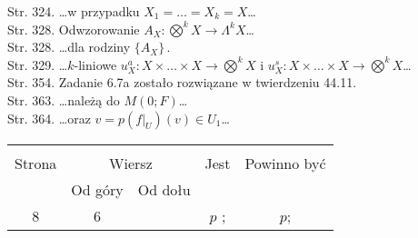 \documentclass[a4paper,11pt]{article}
\begin{document}
Str. 324. \ldots w przypadku $X_{ 1 } = \ldots = X_{ k } = X$\ldots \\
Str. 328. Odwzorowanie $A_{ X } : \bigotimes^{ k } X \rightarrow \Lambda^{ k } X$\ldots \\
Str. 328. \ldots dla rodziny $\{ A_{ X } \} \, .$ \\
Str. 329. \ldots $k$-liniowe
$u^{ a }_{ X } : X \times \ldots \times X \rightarrow \bigotimes^{ k } X$ i
$u^{ s }_{ X } : X \times \ldots \times X \rightarrow \bigotimes^{ k } X$\ldots \\
Str. 354. Zadanie \romannumeral6.7a zostało rozwiązane w
twierdzeniu 44.11. \\
Str. 363. \ldots należą do $M( 0; F )$\ldots \\
Str. 364. \ldots oraz $v = p( f |_{ U } ) ( v ) \in U_{ 1 }$\ldots \\




















\begin{center}

  \begin{tabular}{|c|c|c|c|c|}
    \hline
    & \multicolumn{2}{c|}{} & & \\
    Strona & \multicolumn{2}{c|}{Wiersz} & Jest
                              & Powinno być \\ \cline{2-3}
    & Od góry & Od dołu & & \\
    \hline
    8   & 6 & & $p$ ; & $p$; \\
    \hline
  \end{tabular}

\end{center}
\end{document}
